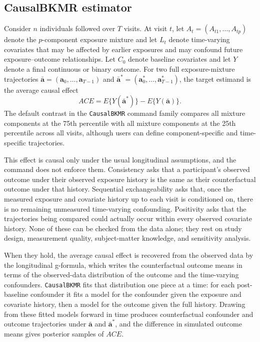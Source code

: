 \documentclass[11pt]{article}
\newcommand{\pkg}[1]{\texttt{#1}}
\begin{document}
\subsection*{CausalBKMR estimator}
Consider $n$ individuals followed over $T$ visits. At visit $t$, let $A_t = (A_{t1}, \ldots, A_{tp})$ denote the $p$-component exposure mixture and let $L_t$ denote time-varying covariates that may be affected by earlier exposures and may confound future exposure--outcome relationships. Let $C_0$ denote baseline covariates and let $Y$ denote a final continuous or binary outcome. For two full exposure-mixture trajectories $\bar{\mathbf{a}} = (\mathbf{a}_0,\ldots,\mathbf{a}_{T-1})$ and $\bar{\mathbf{a}}^* = (\mathbf{a}^*_0,\ldots,\mathbf{a}^*_{T-1})$, the target estimand is the average causal effect
\[
  ACE = E\{Y(\bar{\mathbf{a}}^*)\} - E\{Y(\bar{\mathbf{a}})\}.
\]
The default contrast in the \pkg{CausalBKMR} command family compares all mixture components at the 75th percentile with all mixture components at the 25th percentile across all visits, although users can define component-specific and time-specific trajectories.

This effect is causal only under the usual longitudinal assumptions, and the command does not enforce them. Consistency asks that a participant's observed outcome under their observed exposure history is the same as their counterfactual outcome under that history. Sequential exchangeability asks that, once the measured exposure and covariate history up to each visit is conditioned on, there is no remaining unmeasured time-varying confounding. Positivity asks that the trajectories being compared could actually occur within every observed covariate history. None of these can be checked from the data alone; they rest on study design, measurement quality, subject-matter knowledge, and sensitivity analysis.

When they hold, the average causal effect is recovered from the observed data by the longitudinal g-formula, which writes the counterfactual outcome means in terms of the observed-data distribution of the outcome and the time-varying confounders. \pkg{CausalBKMR} fits that distribution one piece at a time: for each post-baseline confounder it fits a model for the confounder given the exposure and covariate history, then a model for the outcome given the full history. Drawing from these fitted models forward in time produces counterfactual confounder and outcome trajectories under $\bar{\mathbf{a}}$ and $\bar{\mathbf{a}}^*$, and the difference in simulated outcome means gives posterior samples of $ACE$.
\end{document}
